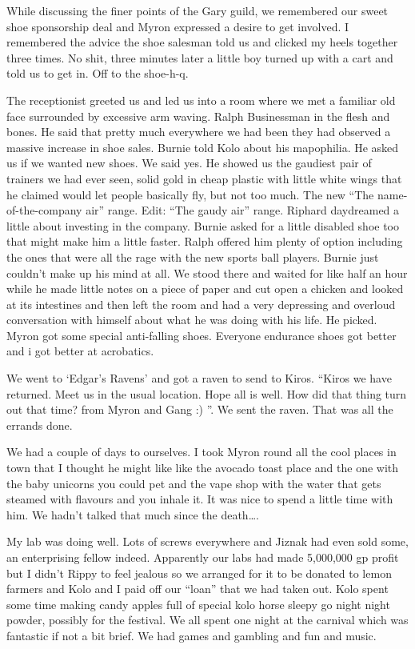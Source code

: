 While discussing the finer points of the Gary guild, we remembered our sweet shoe sponsorship deal and Myron expressed a desire to get involved. I remembered the advice the shoe salesman told us and clicked my heels together three times. No shit, three minutes later a little boy turned up with a cart and told us to get in. Off to the shoe-h-q.\medskip

The receptionist greeted us and led us into a room where we met a familiar old face surrounded by excessive arm waving. Ralph Businessman in the flesh and bones. He said that pretty much everywhere we had been they had observed a massive increase in shoe sales. Burnie told Kolo about his mapophilia. He asked us if we wanted new shoes. We said yes. He showed us the gaudiest pair of trainers we had ever seen, solid gold in cheap plastic with little white wings that he claimed would let people basically fly, but not too much. The new “The name-of-the-company air” range. Edit: “The gaudy air” range. Riphard daydreamed a little about investing in the company. Burnie asked for a little disabled shoe too that might make him a little faster. Ralph offered him plenty of option including the ones that were all the rage with the new sports ball players. Burnie just couldn’t make up his mind at all. We stood there and waited for like half an hour while he made little notes on a piece of paper and cut open a chicken and looked at its intestines and then left the room and had a very depressing and overloud conversation with himself about what he was doing with his life. He picked. Myron got some special anti-falling shoes. Everyone endurance shoes got better and i got better at acrobatics.\medskip

We went to ‘Edgar’s Ravens’ and got a raven to send to Kiros. “Kiros we have returned. Meet us in the usual location. Hope all is well. How did that thing turn out that time? from Myron and Gang :) ”. We sent the raven. That was all the errands done.\medskip

We had a couple of days to ourselves. I took Myron round all the cool places in town that I thought he might like like the avocado toast place and the one with the baby unicorns you could pet and the vape shop with the water that gets steamed with flavours and you inhale it. It was nice to spend a little time with him. We hadn’t talked that much since the death….\medskip

My lab was doing well. Lots of screws everywhere and Jiznak had even sold some, an enterprising fellow indeed. Apparently our labs had made 5,000,000 gp profit but I didn’t Rippy to feel jealous so we arranged for it to be donated to lemon farmers and Kolo and I paid off our “loan” that we had taken out. Kolo spent some time making candy apples full of special kolo horse sleepy go night night powder, possibly for the festival. We all spent one night at the carnival which was fantastic if not a bit brief. We had games and gambling and fun and music.\medskip

